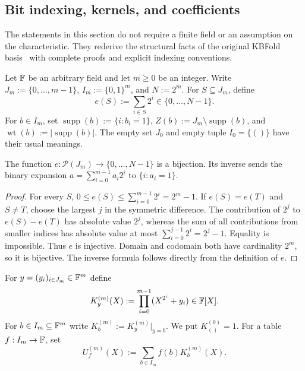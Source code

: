 \subsection{Bit indexing, kernels, and coefficients}\label{sec:kbalgebra:bits}

The statements in this section do not require a finite field or an assumption on the characteristic. They rederive the structural facts of the original KBFold basis~\cite{MkhidaKBFold2026} with complete proofs and explicit indexing conventions.

\begin{definition}\label{def:kbalgebra:bits}
Let $\mathbb{F}$ be an arbitrary field and let $m\geq0$ be an integer. Write $J_m:=\{0,\ldots,m-1\}$, $I_m:=\{0,1\}^m$, and $N:=2^m$. For $S\subseteq J_m$, define
\[
 e(S):=\sum_{i\in S}2^i\in\{0,\ldots,N-1\}.
\]
For $b\in I_m$, set $\operatorname{supp}(b):=\{i:b_i=1\}$, $Z(b):=J_m\setminus\operatorname{supp}(b)$, and $\operatorname{wt}(b):=|\operatorname{supp}(b)|$. The empty set $J_0$ and empty tuple $I_0=\{()\}$ have their usual meanings.
\end{definition}

\begin{lemma}\label{lem:kbalgebra:binary-bijection}
The function $e:\mathcal P(J_m)\to\{0,\ldots,N-1\}$ is a bijection. Its inverse sends the binary expansion $a=\sum_{i=0}^{m-1}a_i2^i$ to $\{i:a_i=1\}$.
\end{lemma}
\begin{proof}
For every $S$, $0\leq e(S)\leq\sum_{i=0}^{m-1}2^i=2^m-1$. If $e(S)=e(T)$ and $S\neq T$, choose the largest $j$ in the symmetric difference. The contribution of $2^j$ to $e(S)-e(T)$ has absolute value $2^j$, whereas the sum of all contributions from smaller indices has absolute value at most $\sum_{i=0}^{j-1}2^i=2^j-1$. Equality is impossible. Thus $e$ is injective. Domain and codomain both have cardinality $2^m$, so it is bijective. The inverse formula follows directly from the definition of $e$.
\end{proof}

\begin{definition}\label{def:kbalgebra:kernel}
For $y=(y_i)_{i\in J_m}\in\mathbb{F}^m$ define
\[
 K_y^{(m)}(X):=\prod_{i=0}^{m-1}(X^{2^i}+y_i)\in\mathbb{F}[X].
\]
For $b\in I_m\subseteq\mathbb{F}^m$ write $K_b^{(m)}:=K_y^{(m)}|_{y=b}$. We put $K_{()}^{(0)}=1$. For a table $f:I_m\to\mathbb{F}$, set
\[
 U_f^{(m)}(X):=\sum_{b\in I_m}f(b)K_b^{(m)}(X).
\]
\end{definition}

